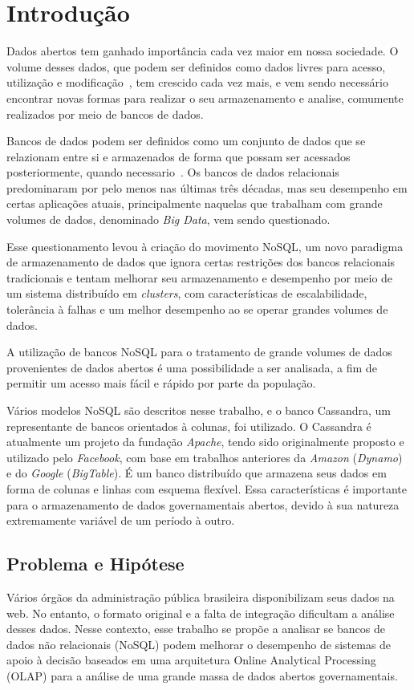 \chapter{Introdução}

Dados abertos tem ganhado importância cada vez maior em nossa sociedade. O volume desses dados, que podem ser definidos como dados livres para acesso, utilização e modificação~\cite{opendefinition}, tem crescido cada vez mais, e vem sendo necessário encontrar novas formas para realizar o seu armazenamento e analise, comumente realizados por meio de bancos de dados.

Bancos de dados podem ser definidos como um conjunto de dados que se relazionam entre si e armazenados de forma que possam ser acessados posteriormente, quando necessario~\cite{leavitt2010nosql}.
Os bancos de dados relacionais predominaram por pelo menos nas últimas três décadas, mas seu desempenho em certas aplicações atuais, principalmente naquelas que trabalham com grande volumes de dados, denominado \emph{Big Data}, vem sendo questionado. 

Esse questionamento levou à criação do movimento NoSQL, um novo paradigma de armazenamento de dados que ignora certas restrições dos bancos relacionais tradicionais e tentam melhorar seu armazenamento e desempenho por meio de um sistema distribuído em \emph{clusters}, com características de escalabilidade, tolerância à falhas e um melhor desempenho ao se operar grandes volumes de dados.

A utilização de bancos NoSQL para o tratamento de grande volumes de dados provenientes de dados abertos é uma possibilidade a ser analisada, a fim de permitir um acesso mais fácil e rápido por parte da população. 

Vários modelos NoSQL são descritos nesse trabalho, e o banco Cassandra, um representante de bancos orientados à colunas, foi utilizado. O Cassandra é atualmente um projeto da fundação \emph{Apache}, tendo sido  originalmente proposto e utilizado pelo \emph{Facebook}, com base em trabalhos anteriores da \emph{Amazon} (\emph{Dynamo}) e do \emph{Google} (\emph{BigTable}). É um banco distribuído que armazena seus dados em forma de colunas e linhas com esquema flexível. Essa características é importante para o armazenamento de dados governamentais abertos, devido à sua natureza extremamente variável de um período à outro.

\section{Problema e Hipótese}
Vários órgãos da administração pública brasileira disponibilizam seus dados na web. No entanto, o formato original e a falta de integração dificultam a análise desses dados. Nesse contexto, esse trabalho se propõe a analisar se bancos de dados não relacionais (NoSQL) podem melhorar o desempenho de sistemas de apoio à decisão baseados em uma arquitetura Online Analytical Processing (OLAP) para a análise de uma grande massa de dados abertos governamentais.


